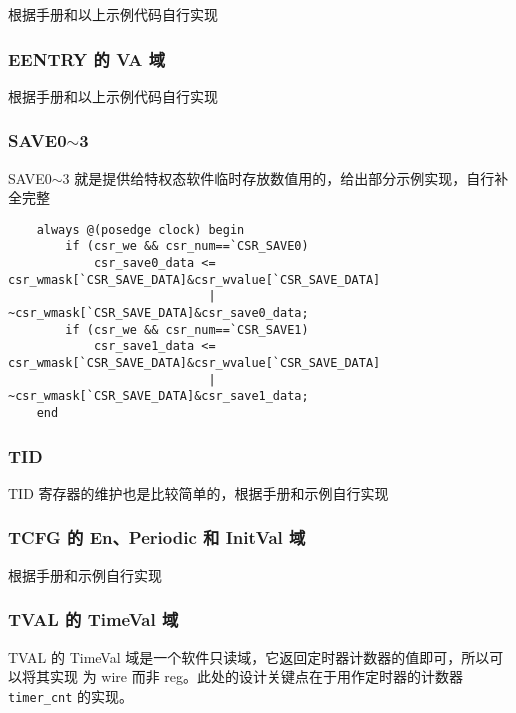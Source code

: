 根据手册和以上示例代码自行实现

\subsubsection{EENTRY 的 VA 域}

根据手册和以上示例代码自行实现

\subsubsection{SAVE0$\sim$3}

SAVE0$\sim$3 就是提供给特权态软件临时存放数值用的，给出部分示例实现，自行补全完整

\begin{lstlisting}
    always @(posedge clock) begin
        if (csr_we && csr_num==`CSR_SAVE0)
            csr_save0_data <= csr_wmask[`CSR_SAVE_DATA]&csr_wvalue[`CSR_SAVE_DATA]
                            | ~csr_wmask[`CSR_SAVE_DATA]&csr_save0_data;
        if (csr_we && csr_num==`CSR_SAVE1)
            csr_save1_data <= csr_wmask[`CSR_SAVE_DATA]&csr_wvalue[`CSR_SAVE_DATA]
                            | ~csr_wmask[`CSR_SAVE_DATA]&csr_save1_data;
    end
\end{lstlisting}

\subsubsection{TID}

TID 寄存器的维护也是比较简单的，根据手册和示例自行实现

\subsubsection{TCFG 的 En、Periodic 和 InitVal 域}

根据手册和示例自行实现

\subsubsection{TVAL 的 TimeVal 域}

TVAL 的 TimeVal 域是一个软件只读域，它返回定时器计数器的值即可，所以可以将其实现
为 wire 而非 reg。此处的设计关键点在于用作定时器的计数器 \texttt{timer\_cnt} 的实现。

